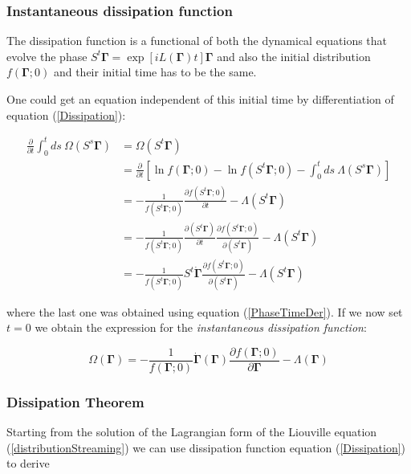 \documentclass[a4paper,12pt]{article}
\begin{document}

\subsubsection{Instantaneous dissipation function}

The dissipation function is a functional of both the dynamical equations that evolve the phase $S^t \bm{\Gamma} = \exp[iL(\bm{\Gamma})t]\bm{\Gamma}$ and also the initial distribution $f(\bm{\Gamma};0)$ and their initial time has to be the same.

One could get an equation independent of this initial time by differentiation of equation (\ref{Dissipation}):

\begin{equation}
\begin{aligned}
  \frac{\partial}{\partial t}\int_0^t ds\ \Omega(S^s  \bm{\Gamma}) &= \Omega(S^t \bm{\Gamma})\\
  &=\frac{\partial}{\partial t}[\ln{f(\bm{\Gamma};0)}-\ln{f(S^t\bm{\Gamma};0)}
-\int_0^t ds \ \Lambda(S^s \bm{\Gamma})
]\\
&=-\frac{1}{f(S^t\bm{\Gamma};0)}\frac{\partial f(S^t\bm{\Gamma};0)}{\partial t}-\Lambda(S^t \bm{\Gamma})\\
&=-\frac{1}{f(S^t\bm{\Gamma};0)}\frac{\partial( S^t \bm{\Gamma})}{\partial t}\frac{\partial f(S^t\bm{\Gamma};0)}{\partial(S^t \bm{\Gamma})}-\Lambda(S^t \bm{\Gamma})\\
&=-\frac{1}{f(S^t\bm{\Gamma};0)}S^t\dot{\bm{\Gamma}}
\frac{\partial f(S^t\bm{\Gamma};0)}{\partial(S^t \bm{\Gamma})}-\Lambda(S^t \bm{\Gamma})
\end{aligned}
\end{equation}

where the last one was obtained using equation (\ref{PhaseTimeDer}). 
If we now set $t=0$ we obtain the expression for the \textit{instantaneous dissipation function}:

\begin{equation}
  \Omega(\bm{\Gamma})=-\frac{1}{f(\bm{\Gamma};0)}\dot{\bm{\Gamma}}(\bm{\Gamma})\frac{\partial{f(\bm{\Gamma};0)}}{\partial{\bm{\Gamma}}}-\Lambda(\bm{\Gamma})
\end{equation}

\subsubsection{Dissipation Theorem}

Starting from the solution of the Lagrangian form of the Liouville equation (\ref{distributionStreaming}) we can use dissipation function equation (\ref{Dissipation}) to derive
\end{document}
